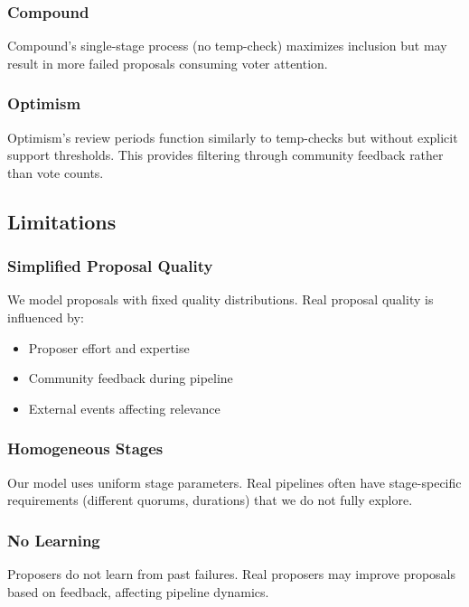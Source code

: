 \subsubsection{Compound}

Compound's single-stage process (no temp-check) maximizes inclusion but may result in more failed proposals consuming voter attention.

\subsubsection{Optimism}

Optimism's review periods function similarly to temp-checks but without explicit support thresholds. This provides filtering through community feedback rather than vote counts.

\subsection{Limitations}

\subsubsection{Simplified Proposal Quality}

We model proposals with fixed quality distributions. Real proposal quality is influenced by:
\begin{itemize}
    \item Proposer effort and expertise
    \item Community feedback during pipeline
    \item External events affecting relevance
\end{itemize}

\subsubsection{Homogeneous Stages}

Our model uses uniform stage parameters. Real pipelines often have stage-specific requirements (different quorums, durations) that we do not fully explore.

\subsubsection{No Learning}

Proposers do not learn from past failures. Real proposers may improve proposals based on feedback, affecting pipeline dynamics.

